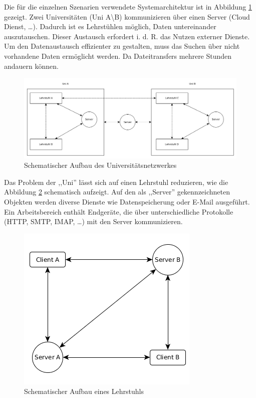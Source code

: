 \documentclass[oneside, ngerman, toc=bibliography,bibliography=totoc,listof=entryprefix, open=right,numbers=noenddot,fontsize=12pt]{scrbook}
\begin{document}
Die für die einzelnen Szenarien verwendete Systemarchitektur ist in Abbildung \ref{fig:ist-struktur} gezeigt. Zwei Universitäten (Uni A\textbackslash{}B) kommunizieren über einen Server (Cloud Dienst, \ldots). Dadurch ist es Lehrstühlen möglich, Daten untereinander auszutauschen. Dieser Austausch erfordert i. d. R. das Nutzen externer Dienste. Um den Datenaustausch effizienter zu gestalten, muss das Suchen über nicht vorhandene Daten ermöglicht werden. Da Dateitransfers mehrere Stunden andauern können.

\begin{figure}[htbp] 
    \centering
    \includegraphics[width=\textwidth]{Masterarbeit_Bilder/Lehrstuhl_Datentausch_extern.png}
    \caption{Schematischer Aufbau des Universitätsnetzwerkes}
    \label{fig:ist-struktur}
\end{figure}    

Das Problem der ,,Uni'' lässt sich auf einen Lehrstuhl reduzieren, wie  die Abbildung \ref{fig:ist-struktur2} schematisch aufzeigt.
Auf den als ,,Server'' gekennzeichneten Objekten werden diverse Dienste wie Datenspeicherung oder E-Mail ausgeführt. Ein Arbeitsbereich enthält Endgeräte, die über unterschiedliche Protokolle (HTTP, SMTP, IMAP, \ldots) mit den Server kommunizieren.

\begin{figure}[htbp] 
	\centering
	\includegraphics{Masterarbeit_Bilder/Lehrstuhl_Datentausch_intern.png}
	\caption{Schematischer Aufbau eines Lehrstuhls}
	\label{fig:ist-struktur2}
\end{figure}  
\end{document}
